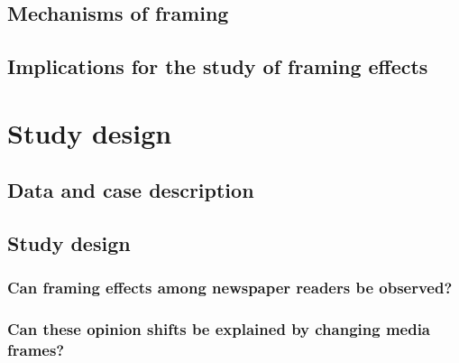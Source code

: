 \documentclass{article}
\begin{document}
\subsection{Mechanisms of framing}



\subsection{Implications for the study of framing effects}



\section{Study design}

\subsection{Data and case description}

\subsection{Study design}

\subsubsection{Can framing effects among newspaper readers be observed?}


\subsubsection{Can these opinion shifts be explained by changing media frames?}

\end{document}
